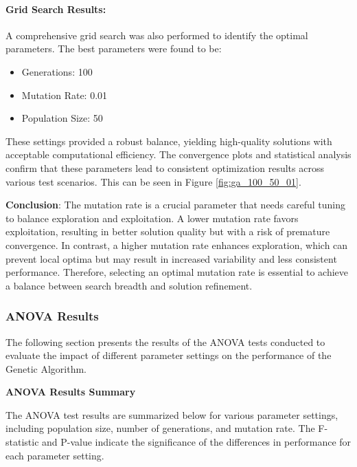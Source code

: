 \documentclass[
]{article}
\begin{document}
    \paragraph{Grid Search Results:}
    A comprehensive grid search was also performed to identify the optimal parameters. The best parameters were found to be:
    \begin{itemize}
        \item Generations: 100
        \item Mutation Rate: 0.01
        \item Population Size: 50
    \end{itemize}
    These settings provided a robust balance, yielding high-quality solutions with acceptable computational efficiency. The convergence plots and statistical analysis confirm that these parameters lead to consistent optimization results across various test scenarios. This can be seen in Figure \ref{fig:ga_100_50_01}.


    \textbf{Conclusion}: The mutation rate is a crucial parameter that needs careful tuning to balance exploration and exploitation. A lower mutation rate favors exploitation, resulting in better solution quality but with a risk of premature convergence. In contrast, a higher mutation rate enhances exploration, which can prevent local optima but may result in increased variability and less consistent performance. Therefore, selecting an optimal mutation rate is essential to achieve a balance between search breadth and solution refinement.

    \subsubsection{ANOVA Results}

    The following section presents the results of the ANOVA tests conducted to evaluate the impact of different parameter settings on the performance of the Genetic Algorithm.

    \textbf{ANOVA Results Summary}

    The ANOVA test results are summarized below for various parameter settings, including population size, number of generations, and mutation rate. The F-statistic and P-value indicate the significance of the differences in performance for each parameter setting.
\end{document}
